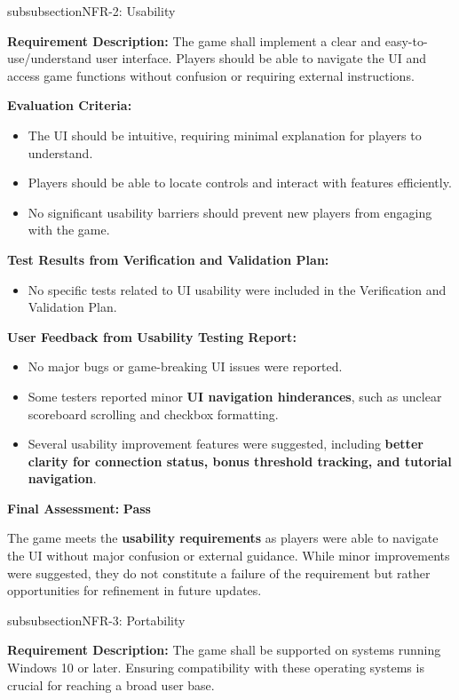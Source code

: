 \documentclass[12pt, titlepage]{article}
\begin{document}
\*subsubsection{NFR-2: Usability}

\textbf{Requirement Description:}  
The game shall implement a clear and easy-to-use/understand user interface. Players should be able to navigate the UI and access game functions without confusion or requiring external instructions.

\textbf{Evaluation Criteria:}  
\begin{itemize}
    \item The UI should be intuitive, requiring minimal explanation for players to understand.
    \item Players should be able to locate controls and interact with features efficiently.
    \item No significant usability barriers should prevent new players from engaging with the game.
\end{itemize}

\textbf{Test Results from Verification and Validation Plan:}  
\begin{itemize}
    \item No specific tests related to UI usability were included in the Verification and Validation Plan.
\end{itemize}

\textbf{User Feedback from Usability Testing Report:}  
\begin{itemize}
    \item No major bugs or game-breaking UI issues were reported.
    \item Some testers reported minor \textbf{UI navigation hinderances}, such as unclear scoreboard scrolling and checkbox formatting.
    \item Several usability improvement features were suggested, including \textbf{better clarity for connection status, bonus threshold tracking, and tutorial navigation}.
\end{itemize}

\textbf{Final Assessment:} \textbf{Pass}  

The game meets the \textbf{usability requirements} as players were able to navigate the UI without major confusion or external guidance. While minor improvements were suggested, they do not constitute a failure of the requirement but rather opportunities for refinement in future updates.

\*subsubsection{NFR-3: Portability}

\textbf{Requirement Description:}  
The game shall be supported on systems running Windows 10 or later. Ensuring compatibility with these operating systems is crucial for reaching a broad user base.
\end{document}
